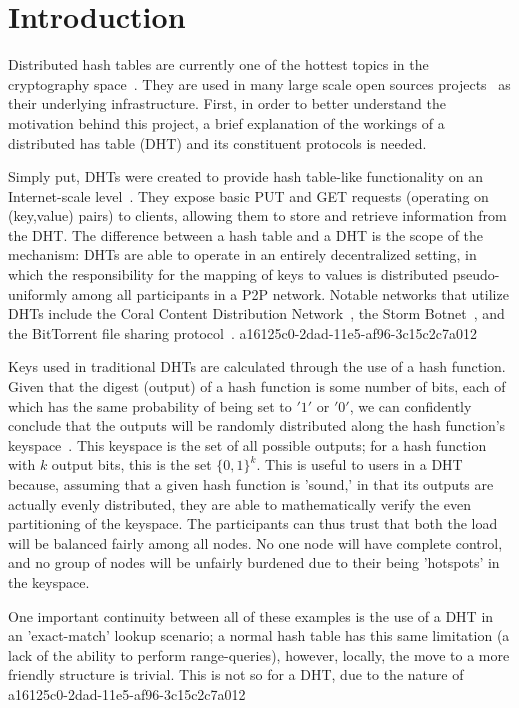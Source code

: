 \documentclass[12pt]{article}
\begin{document}
\section{Introduction}
\par Distributed hash tables are currently one of the hottest topics in the cryptography space~\cite{Stoica:2001dj,Rowstron:2001ea,Ratnasamy:2001wn}. They are used in many large scale open sources projects~\cite{Freitas:2013tb,Xu:2010vs,Perfitt:2010fh} as their underlying infrastructure. First, in order to better understand the motivation behind this project, a brief explanation of the workings of a distributed has table (DHT) and its constituent protocols is needed.

\par Simply put, DHTs were created to provide hash table-like functionality on an Internet-scale level~\cite{Ratnasamy:2001wn}. They expose basic PUT and GET requests (operating on (key,value) pairs) to clients, allowing them to store and retrieve information from the DHT. The difference between a hash table and a DHT is the scope of the mechanism: DHTs are able to operate in an entirely decentralized setting, in which the responsibility for the mapping of keys to values is distributed pseudo-uniformly among all participants in a P2P network. Notable networks that utilize DHTs include the Coral Content Distribution Network~\cite{Freedman:2004vb}, the Storm Botnet~\cite{Holz:2008uk}, and the BitTorrent file sharing protocol~\cite{Cohen:y1_8mBnw}.
a16125c0-2dad-11e5-af96-3c15c2c7a012
\par Keys used in traditional DHTs are calculated through the use of a hash function. Given that the digest (output) of a hash function is some number of bits, each of which has the same probability of being set to $'1'$ or $'0'$, we can confidently conclude that the outputs will be randomly distributed along the hash function's keyspace~. This keyspace is the set of all possible outputs; for a hash function with $k$ output bits, this is the set $\{0,1\}^k$. This is useful to users in a DHT because, assuming that a given hash function is 'sound,' in that its outputs are actually evenly distributed, they are able to mathematically verify the even partitioning of the keyspace. The participants can thus trust that both the load will be balanced fairly among all nodes. No one node will have complete control, and no group of nodes will be unfairly burdened due to their being 'hotspots' in the keyspace.~

\par One important continuity between all of these examples is the use of a DHT in an 'exact-match' lookup scenario; a normal hash table has this same limitation (a lack of the ability to perform range-queries), however, locally, the move to a more friendly structure is trivial. This is not so for a DHT, due to the nature of
\printbibliography
a16125c0-2dad-11e5-af96-3c15c2c7a012
\end{document}
